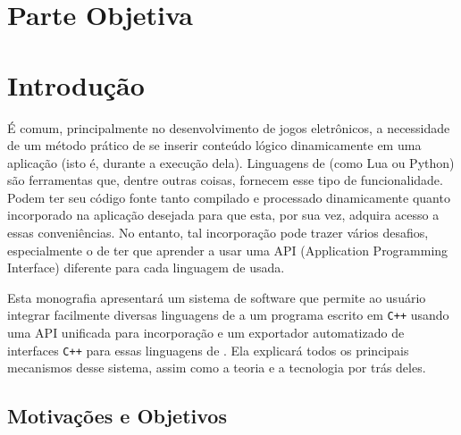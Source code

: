 \chapter*{Parte Objetiva}
\label{sec:parte_objetiva}
\chapter{Introdução}
\label{sec:intr}

É comum, principalmente no desenvolvimento de jogos eletrônicos, a necessidade
de um método prático de se inserir conteúdo lógico dinamicamente em uma
aplicação (isto é, durante a execução dela). Linguagens de \script (como Lua ou
Python) são ferramentas que, dentre outras coisas, fornecem esse tipo de
funcionalidade. Podem ter seu código fonte tanto compilado e processado
dinamicamente quanto incorporado na aplicação desejada para que esta, por sua
vez, adquira acesso a essas conveniências. No entanto, tal incorporação pode
trazer vários desafios, especialmente o de ter que aprender a usar uma API
(Application Programming Interface) diferente para cada linguagem de \script
usada.

Esta monografia apresentará um sistema de software que permite ao usuário
integrar facilmente diversas linguagens de \script a um programa escrito em
\verb$C++$ usando uma API unificada para incorporação e um exportador
automatizado de interfaces \verb$C++$ para essas linguagens de \script. Ela
explicará todos os principais mecanismos desse sistema, assim como a teoria e a
tecnologia por trás deles.

\section{Motivações e Objetivos}
\label{sec:intr:motivacoes_objetivos}

